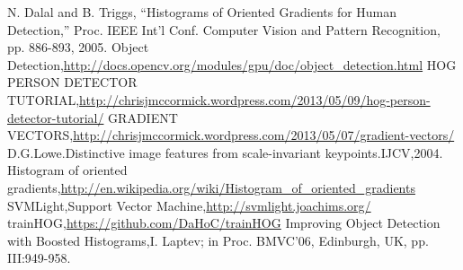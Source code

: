 \documentclass[10pt,technote,onecolumn,twoside]{IEEEtran}
\begin{document}


\begin{thebibliography}{99}
N. Dalal and B. Triggs, “Histograms of Oriented Gradients for
Human Detection,” Proc. IEEE Int’l Conf. Computer Vision and
Pattern Recognition, pp. 886-893, 2005.
Object Detection,\url{http://docs.opencv.org/modules/gpu/doc/object_detection.html}
HOG PERSON DETECTOR TUTORIAL,\url{http://chrisjmccormick.wordpress.com/2013/05/09/hog-person-detector-tutorial/}
GRADIENT VECTORS,\url{http://chrisjmccormick.wordpress.com/2013/05/07/gradient-vectors/}
D.G.Lowe.Distinctive image features from scale-invariant keypoints.IJCV,2004.
Histogram of oriented gradients,\url{http://en.wikipedia.org/wiki/Histogram_of_oriented_gradients}
SVMLight,Support Vector Machine,\url{http://svmlight.joachims.org/}
trainHOG,\url{https://github.com/DaHoC/trainHOG}
Improving Object Detection with Boosted Histograms,I. Laptev; in Proc. BMVC'06, Edinburgh, UK, pp. III:949-958.
\end{thebibliography}
%
\end{document}
